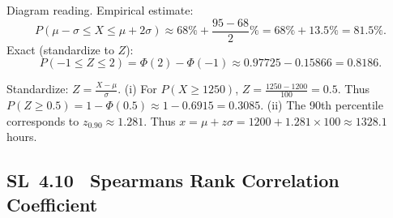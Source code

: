 \documentclass[11pt]{article}
\def\textbf#1{#1}%
\newcommand{\tocsubsection}[1]{\subsection{#1}}
\begin{document}
\begin{solution}
\textbf{Diagram reading.}
Empirical estimate:
\[
P(\mu-\sigma\le X\le\mu+2\sigma)\approx 68\% + \frac{95-68}{2}\%=68\%+13.5\%=\boxed{81.5\%}.
\]
Exact (standardize to $Z$):
\[
P(-1\le Z\le 2)=\Phi(2)-\Phi(-1)\approx 0.97725-0.15866=\boxed{0.8186}.
\]

\begin{center}
\end{center}
\end{solution}


\begin{solution}
Standardize: $Z=\frac{X-\mu}{\sigma}$.  (i) For $P(X\ge1250)$,
$Z=\frac{1250-1200}{100}=0.5$.  Thus $P(Z\ge0.5)=1-\Phi(0.5)\approx1-0.6915
=0.3085$.  (ii) The 90th percentile corresponds to $z_{0.90}\approx1.281$.
Thus $x=\mu+z\sigma=1200+1.281\times100\approx1328.1$ hours.
\end{solution}

\tocsubsection{SL 4.10 \; Spearmans Rank Correlation Coefficient}


\providecommand{\pt}[2]{\fill (#1,#2) circle (1.6pt);} %
\end{document}
